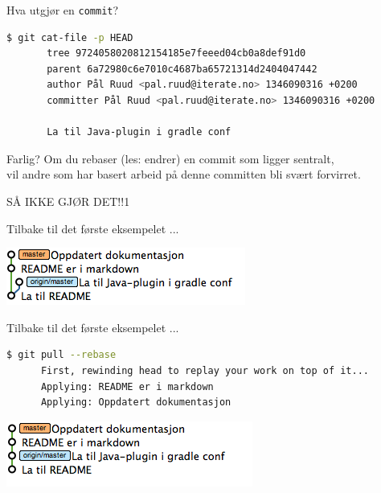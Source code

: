 \documentclass{beamer}
\begin{document}
\begin{frame}[fragile]{Hva utgjør en \texttt{commit}?}
    \begin{lstlisting}[language=bash]
       $ git cat-file -p HEAD
       tree 9724058020812154185e7feeed04cb0a8def91d0
       parent 6a72980c6e7010c4687ba65721314d2404047442
       author Pål Ruud <pal.ruud@iterate.no> 1346090316 +0200
       committer Pål Ruud <pal.ruud@iterate.no> 1346090316 +0200

       La til Java-plugin i gradle conf
    \end{lstlisting}
\end{frame}

\begin{frame}{Farlig?}
    Om du rebaser (les: endrer) en commit som ligger sentralt,\\
    vil andre som har basert arbeid på denne committen bli svært forvirret.\\
    \pause
    \bigskip
    \begin{center}
        SÅ IKKE GJØR DET!!1
    \end{center}
\end{frame}

\begin{frame}{Tilbake til det første eksempelet ...}
    \begin{center}
        \includegraphics[scale=0.7]{1.png}
    \end{center}
\end{frame}

\begin{frame}[fragile]{Tilbake til det første eksempelet ...}
    \begin{lstlisting}[language=bash]
      $ git pull --rebase
      First, rewinding head to replay your work on top of it...
      Applying: README er i markdown
      Applying: Oppdatert dokumentasjon
    \end{lstlisting}
    \medskip
    \pause
    \includegraphics[scale=0.7]{5.png}
\end{frame}
\end{document}
